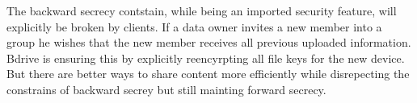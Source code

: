 The backward secrecy contstain, while being an imported security feature, will explicitly be broken by clients. If a data owner invites a new member into a group he wishes that the new member receives all previous uploaded information. Bdrive is ensuring this by explicitly reencyrpting all file keys for the new device. But there are better ways to share content more efficiently while disrepecting the constrains of backward secrey but still mainting forward secrecy. 